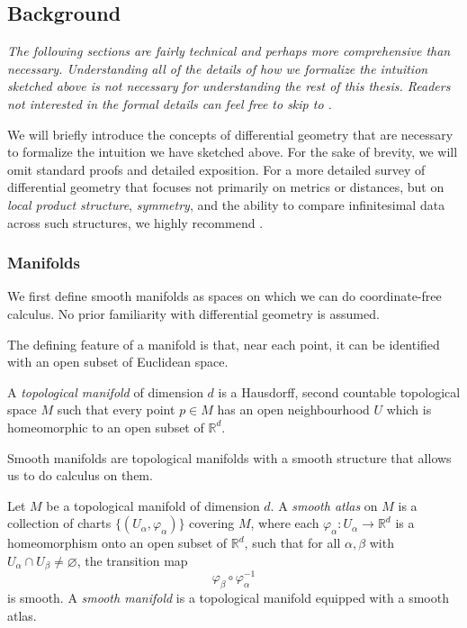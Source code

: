 \subsection{Background}
\label{sec:background}
\emph{The following sections are fairly technical and perhaps more comprehensive than necessary. Understanding all of the details of how we formalize the intuition sketched above is not necessary for understanding the rest of this thesis. Readers not interested in the formal details can feel free to skip to .}

We will briefly introduce the concepts of differential geometry that are necessary to formalize the intuition we have sketched above. For the sake of brevity, we will omit standard proofs and detailed exposition. For a more detailed survey of differential geometry that focuses not primarily on metrics or distances, but on \emph{local product structure}, \emph{symmetry}, and the ability to compare
infinitesimal data across such structures, we highly recommend \citep{Sharpe1997}. 
\subsubsection{Manifolds}
\label{subsec:background_smooth_structure}

We first define smooth manifolds as spaces on which we can do coordinate-free calculus.
No prior familiarity with differential geometry is assumed.

The defining feature of a manifold is that, near each point, it can be identified with
an open subset of Euclidean space.

\begin{gdefn}
A \emph{topological manifold} of dimension $d$ is a Hausdorff, second countable topological
space $M$ such that every point $p\in M$ has an open neighbourhood $U$ which is
homeomorphic to an open subset of $\mathbb{R}^d$.
\end{gdefn}

Smooth manifolds are topological manifolds with a smooth structure that allows us to do calculus on them.

\begin{gdefn}
Let $M$ be a topological manifold of dimension $d$.
A \emph{smooth atlas} on $M$ is a collection of charts
$\{(U_\alpha,\varphi_\alpha)\}$ covering $M$, where each
$\varphi_\alpha:U_\alpha\to\mathbb{R}^d$ is a homeomorphism onto an open subset of
$\mathbb{R}^d$, such that for all $\alpha,\beta$ with
$U_\alpha\cap U_\beta\neq\varnothing$, the transition map
\[
\varphi_\beta\circ\varphi_\alpha^{-1}
\]
is smooth.
A \emph{smooth manifold} is a topological manifold equipped with a smooth atlas.
\end{gdefn}


